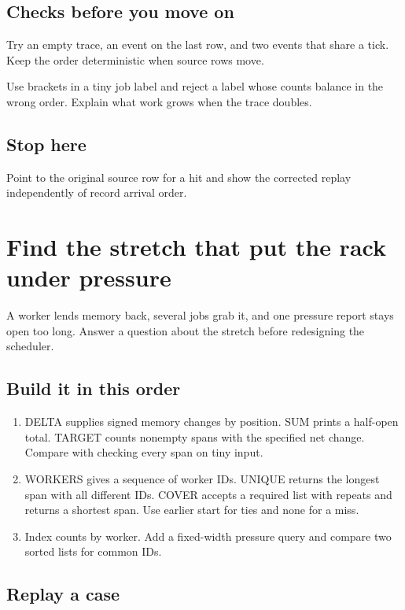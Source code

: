 \documentclass[11pt,letterpaper]{article}
\begin{document}
\subsection*{Checks before you move on}

Try an empty trace, an event on the last row, and two events that share a tick. Keep the order deterministic when source rows move.

Use brackets in a tiny job label and reject a label whose counts balance in the wrong order. Explain what work grows when the trace doubles.

\subsection*{Stop here}

Point to the original source row for a hit and show the corrected replay independently of record arrival order.

\clearpage

\section{Find the stretch that put the rack under pressure}\label{datacenter:02}

A worker lends memory back, several jobs grab it, and one pressure report stays open too long. Answer a question about the stretch before redesigning the scheduler.

\subsection*{Build it in this order}

\begin{enumerate}
\item DELTA supplies signed memory changes by position. SUM prints a half-open total. TARGET counts nonempty spans with the specified net change. Compare with checking every span on tiny input.
\item WORKERS gives a sequence of worker IDs. UNIQUE returns the longest span with all different IDs. COVER accepts a required list with repeats and returns a shortest span. Use earlier start for ties and none for a miss.
\item Index counts by worker. Add a fixed-width pressure query and compare two sorted lists for common IDs.
\end{enumerate}

\subsection*{Replay a case}
\end{document}
